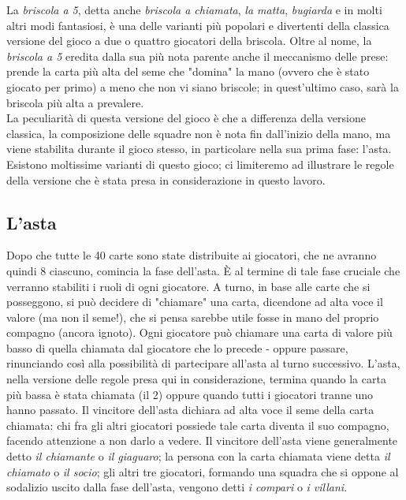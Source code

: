 La \emph{briscola a 5}, detta anche \emph{briscola a chiamata}, \emph{la matta}, \emph{bugiarda} e in molti altri modi fantasiosi, è una delle varianti più popolari e divertenti della classica versione del gioco a due o quattro giocatori della briscola.
Oltre al nome, la \emph{briscola a 5} eredita dalla sua più nota parente anche il meccanismo delle prese: prende la carta più alta del seme che "domina" la mano (ovvero che è stato giocato per primo) a meno che non vi siano briscole; in quest'ultimo caso, sarà la briscola più alta a prevalere.\\
La peculiarità di questa versione del gioco è che a differenza della versione classica, la composizione delle squadre non è nota fin dall'inizio della mano, ma viene stabilita durante il gioco stesso, in particolare nella sua prima fase: l'asta.\\
Esistono moltissime varianti di questo gioco; ci limiteremo ad illustrare le regole della versione che è stata presa in considerazione in questo lavoro.


\subsection{L'asta}
Dopo che tutte le 40 carte sono state distribuite ai giocatori, che ne avranno quindi 8 ciascuno, comincia la fase dell'asta.
È al termine di tale fase cruciale che verranno stabiliti i ruoli di ogni giocatore.
A turno, in base alle carte che si posseggono, si può decidere di "chiamare" una carta, dicendone ad alta voce il valore (ma non il seme!), che si pensa sarebbe utile fosse in mano del proprio compagno (ancora ignoto).
Ogni giocatore può chiamare una carta di valore più basso di quella chiamata dal giocatore che lo precede - oppure passare, rinunciando così alla possibilità di partecipare all'asta al turno successivo.
L'asta, nella versione delle regole presa qui in considerazione, termina quando la carta più bassa è stata chiamata (il 2) oppure quando tutti i giocatori tranne uno hanno passato.
Il vincitore dell'asta dichiara ad alta voce il seme della carta chiamata: chi fra gli altri giocatori possiede tale carta diventa il suo compagno, facendo attenzione a non darlo a vedere.
Il vincitore dell'asta viene generalmente detto \emph{il chiamante} o \emph{il giaguaro};
la persona con la carta chiamata viene detta \emph{il chiamato} o \emph{il socio};
gli altri tre giocatori, formando una squadra che si oppone al sodalizio uscito dalla fase dell'asta, vengono detti \emph{i compari} o \emph{i villani}.

